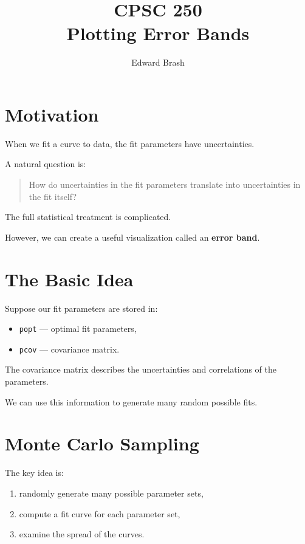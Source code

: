 \documentclass[11pt]{article}
\title{CPSC 250 \\ Plotting Error Bands}
\author{Edward Brash}
\date{}
\begin{document}
\maketitle

\section{Motivation}

When we fit a curve to data, the fit parameters have uncertainties.

A natural question is:

\begin{quote}
How do uncertainties in the fit parameters translate into uncertainties in the fit itself?
\end{quote}

The full statistical treatment is complicated.

However, we can create a useful visualization called an \textbf{error band}.

\section{The Basic Idea}

Suppose our fit parameters are stored in:

\begin{itemize}
    \item \texttt{popt} --- optimal fit parameters,
    \item \texttt{pcov} --- covariance matrix.
\end{itemize}

The covariance matrix describes the uncertainties and correlations of the parameters.

We can use this information to generate many random possible fits.

\section{Monte Carlo Sampling}

The key idea is:

\begin{enumerate}
    \item randomly generate many possible parameter sets,
    \item compute a fit curve for each parameter set,
    \item examine the spread of the curves.
\end{enumerate}
\end{document}
